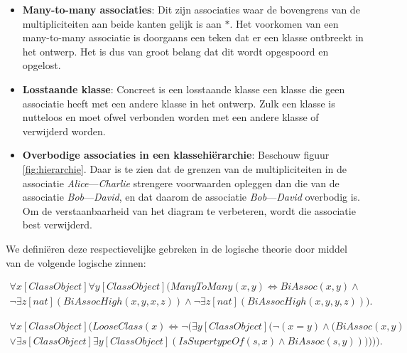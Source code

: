 \begin{itemize}
	\item \textbf{Many-to-many associaties}: Dit zijn associaties waar de bovengrens van de multipliciteiten aan beide kanten gelijk is aan $*$. Het voorkomen van een many-to-many associatie is doorgaans een teken dat er een klasse ontbreekt in het ontwerp. Het is dus van groot belang dat dit wordt opgespoord en opgelost.
	
	\item \textbf{Losstaande klasse}: Concreet is een losstaande klasse een klasse die geen associatie heeft met een andere klasse in het ontwerp. Zulk een klasse is nutteloos en moet ofwel verbonden worden met een andere klasse of verwijderd worden.
	
	\item \textbf{Overbodige associaties in een klassehi\"erarchie}\cite{Balaban2015}: Beschouw figuur \ref{fig:hierarchie}. Daar is te zien dat de grenzen van de multipliciteiten in de associatie \textit{Alice}---\textit{Charlie} strengere voorwaarden opleggen dan die van de associatie \textit{Bob}---\textit{David}, en dat daarom de associatie \textit{Bob}---\textit{David} overbodig is. Om de verstaanbaarheid van het diagram te verbeteren, wordt die associatie best verwijderd.
\end{itemize}

We defini\"eren deze respectievelijke gebreken in de logische theorie door middel van de volgende logische zinnen:

\begin{align}
	\nonumber \forall{x}[ClassObject]\forall{y}[ClassObject](ManyToMany(x,y) \Leftrightarrow BiAssoc(x,y) \land \\ \lnot\exists{z}[nat](BiAssocHigh(x,y,x,z)) \land \lnot\exists{z}[nat](BiAssocHigh(x,y,y,z))).\label{form:manytomany}
\end{align}

\begin{align}
	\nonumber \forall{x}[ClassObject](LooseClass(x) \Leftrightarrow \lnot(\exists{y}[ClassObject](\lnot(x = y) \land (BiAssoc(x,y) \\ \lor \exists{s}[ClassObject]\exists{y}[ClassObject](IsSupertypeOf(s,x) \land BiAssoc(s,y)))))).\label{form:loose}
\end{align}

